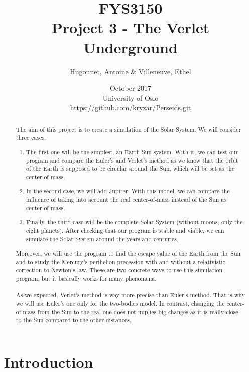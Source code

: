 \documentclass[a4paper, twoside, 11pt]{report}
\title{FYS3150\\Project 3 - The Verlet Underground}
\author{Hugounet, Antoine \& Villeneuve, Ethel}
\date{October 2017 \\University of Oslo \\ \url{https://github.com/kryzar/Perseids.git}}
\theoremstyle{theorem}
\theoremstyle{remark}
\theoremstyle{exemple}
\begin{document}
\maketitle
	
	
\begin{abstract}

	\paragraph{}The aim of this project is to create a simulation of the Solar System. We will consider three cases.
		\begin{enumerate}
			\item{The first one will be the simplest, an Earth-Sun system. With it, we can test our program and compare the Euler's and Verlet's method as we know that the orbit of the Earth is supposed to be circular around the Sun, which will be set as the center-of-mass.}
			\item{In the second case, we will add Jupiter. With this model, we can compare the influence of taking into account the real center-of-mass instead of the Sun as center-of-mass.}
			\item{Finally, the third case will be the complete Solar System (without moons, only the eight planets). After checking that our program is stable and viable, we can simulate the Solar System around the years and centuries.}
		\end{enumerate}
		
	Moreover, we will use the program to find the escape value of the Earth from the Sun and to study the Mercury's perihelion precession with and without a relativistic correction to Newton's law. These are two concrete ways to use this simulation program, but it basically works for many phenomena.
	
	\paragraph{}As we expected, Verlet's method is way more precise than Euler's method. That is why we will use Euler's one only for the two-bodies model. In contrast, changing the center-of-mass from the Sun to the real one does not implies big changes as it is really close to the Sun compared to the other distances.  
	
\end{abstract}


\tableofcontents

\chapter*{Introduction}
\end{document}
